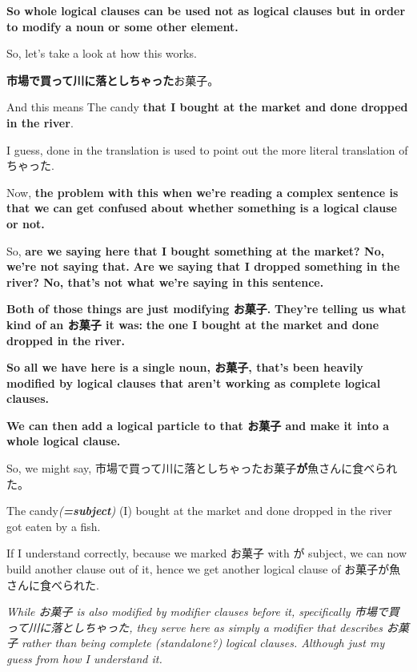 {\bf So whole logical clauses can be used not as logical clauses but in order to modify a noun or some other element.}

So, let's take a look at how this works.

{\bf 市場で買って川に落としちゃった}お菓子。

And this means The candy {\bf that I bought at the market and done dropped in the river}.

I guess, done in the translation is used to point out the more literal translation of ちゃった.

{}

Now, {\bf the problem with this when we're reading a complex sentence is that we can get confused about whether something is a logical clause or not.}

So, {\bf are we saying here that I bought something at the market? No, we're not saying that.} {\bf Are we saying that I dropped something in the river?\crlf
No, that's not what we're saying in this sentence.}

\thinrule

{\bf Both of those things are just modifying お菓子.} {\bf They're telling us what kind of an お菓子 it was:} {\bf the one I bought at the market and done dropped in the river.}

{\bf So all we have here is a single noun, お菓子, that's been heavily modified by logical clauses that aren't working as complete logical clauses.}

\thinrule

{\bf We can then add a logical particle to that お菓子 and make it into a whole logical clause.}

So, we might say, 市場で買って川に落としちゃったお菓子{\bf が}魚さんに食べられた。

The candy{\em ({\bf =subject})} (I) bought at the market and done dropped in the river got eaten by a fish.

{}

If I understand correctly, because we marked お菓子 with が subject, we can now build another clause out of it, hence we get another logical clause of お菓子が魚さんに食べられた.

{\em While お菓子 is also modified by modifier clauses before it, specifically 市場で買って川に落としちゃった, they serve here as simply a modifier that describes お菓子 rather than being complete (standalone?) logical clauses. Although just my guess from how I understand it.}

